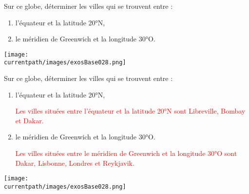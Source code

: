 \begin{exercice*}
    Sur ce globe, déterminer les villes qui se trouvent entre :
    \begin{enumerate}
        \item l'équateur et la latitude \ang{20}N,
        \item le méridien de Greenwich et la longitude \ang{30}O.
    \end{enumerate}
    \begin{center}
        \texttt{[image: \\currentpath/images/exosBase028.png]}    
    \end{center}    
\end{exercice*}
\begin{corrige}
    Sur ce globe, déterminer les villes qui se trouvent entre :

    \begin{enumerate}
        \item l'équateur et la latitude \ang{20}N,
        
        \textcolor{red}{Les villes situées entre l'équateur et la latitude \ang{20}N sont Libreville, Bombay et Dakar.}
        \item le méridien de Greenwich et la longitude \ang{30}O.
        
        \textcolor{red}{Les villes situées entre le méridien de Greenwich et la longitude \ang{30}O sont Dakar, Lisbonne, Londres et Reykjavik.}
    \end{enumerate}
    \begin{center}
        \texttt{[image: \\currentpath/images/exosBase028.png]}    
    \end{center} 
\end{corrige}
